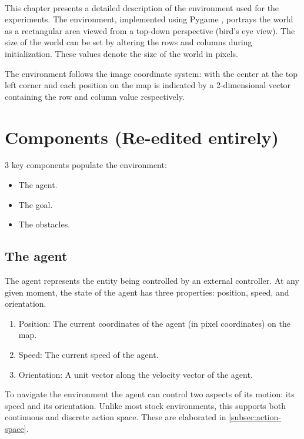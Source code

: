 \label{ch:enviornment}
\\
This chapter presents a detailed description of the environment used for  the experiments. The environment, implemented using Pygame \cite{pygame}, portrays the world as a rectangular area viewed from a top-down perspective (bird's eye view). 
The size of the world can be set by altering the rows and columns during initialization. These values denote the size of the world in pixels.

The environment follows the image coordinate system: with the center at the top left corner and each position on the map is indicated by a 2-dimensional vector containing the row and column value respectively.\\
\section{Components (Re-edited entirely)}
3 key components populate the environment: 
\begin{itemize}
    \item The agent.
    \item The goal.
    \item The obstacles.
\end{itemize}
\subsection{The agent}
The agent represents the entity being controlled by an external controller. At any given moment, the state of the agent has three properties: position, speed, and orientation.
\begin{enumerate}
    \item Position: The current coordinates of the agent (in pixel coordinates) on the map.
    \item Speed: The current speed of the agent.
    \item Orientation: A unit vector along the velocity vector of the agent.
\end{enumerate}
To navigate the environment the agent can control two aspects of its motion: its speed and its orientation.
Unlike most stock environments, this supports both continuous and discrete action space. These are elaborated in \autoref{subsec:action-space}.
